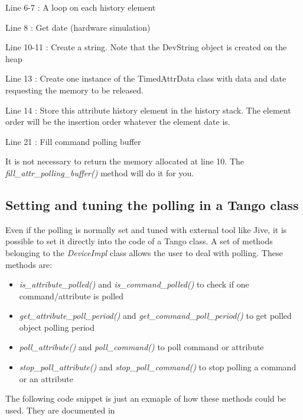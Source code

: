 Line 6-7 : A loop on each history element

Line 8 : Get date (hardware simulation)

Line 10-11 : Create a string. Note that the DevString object is created
on the heap

Line 13 : Create one instance of the TimedAttrData class with data
and date requesting the memory to be released.

Line 14 : Store this attribute history element in the history stack.
The element order will be the insertion order whatever the element
date is.

Line 21 : Fill command polling buffer

It is not necessary to return the memory allocated at line 10. The
\emph{fill\_attr\_polling\_buffer()} method will do it for you.

\subsection{Setting and tuning the polling in a Tango class}

Even if the polling is normally set and tuned with external tool like
Jive, it is possible to set it directly into the code of a Tango class.
A set of methods belonging to the \emph{DeviceImpl} class allows the
user to deal with polling. These methods are:
\begin{itemize}
\item \emph{is\_attribute\_polled()} and \emph{is\_command\_polled()} to
check if one command/attribute is polled
\item \emph{get\_attribute\_poll\_period()} and \emph{get\_command\_poll\_period()}
to get polled object polling period
\item \emph{poll\_attribute()} and \emph{poll\_command()} to poll command
or attribute
\item \emph{stop\_poll\_attribute()} and \emph{stop\_poll\_command()} to
stop polling a command or an attribute
\end{itemize}
The following code snippet is just an exmaple of how these methods
could be used. They are documented in \cite{Tango-dsclasses-doc}



\begin{lyxcode}
~~~~~

\end{lyxcode}



